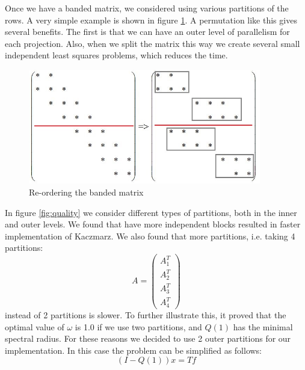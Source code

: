 \documentclass[a4paper,12pt]{article}
\begin{document}
 Once we have a banded matrix, we considered using various partitions of the rows. A very simple example is shown in figure \ref{fig:permutation}. A permutation like this gives several benefits. The first is that we can have an outer level of parallelism for each projection. Also, when we split the matrix this way we create several small independent least squares problems, which reduces the time. 
 
 \begin{figure}[htbp]
\begin{minipage}[b]{1\linewidth}
\centering
\includegraphics[width=4in]{Images/permutation}
\end{minipage}
\caption{Re-ordering the banded matrix}
\label{fig:permutation}
\end{figure}
 
 In figure \ref{fig:quality} we consider different types of partitions, both in the inner and outer levels. We found that have more independent blocks resulted in faster implementation of Kaczmarz. We also found that more partitions, i.e. taking 4 partitions: $$A = \begin{pmatrix} A_1^T  \\A_2 ^T \\ A_3^T \\ A_4^T \end{pmatrix} $$ instead of 2 partitions is slower. 
  To further illustrate this, it proved that the optimal value of $\omega$ is 1.0 if we use two partitions, and $Q(1)$ has the minimal spectral radius. For these reasons we decided to use 2 outer partitions for our implementation. In this case the problem can be simplified as follows: $$(I-Q(1))x = Tf$$
\end{document}

